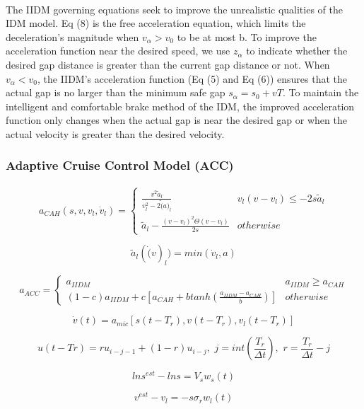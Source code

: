 \documentclass[12pt]{article}
\begin{document}
\paragraph{}
The IIDM governing equations seek to improve the unrealistic qualities of the IDM model. Eq (8) is the free acceleration equation, which limits the deceleration's magnitude when $v_\alpha>v_0$ to be at most b. To improve the acceleration function near the desired speed, we use $z_\alpha$ to indicate whether the desired gap distance is greater than the current gap distance or not.  When $v_\alpha < v_0$, the IIDM's acceleration function (Eq (5) and Eq (6)) ensures that the actual gap is no larger than the minimum safe gap $s_\alpha = s_0+vT$.  To maintain the intelligent and comfortable brake method of the IDM, the improved acceleration function only changes when the actual gap is near the desired gap or when the actual velocity is greater than the desired velocity.
\subsubsection{Adaptive Cruise Control Model (ACC)}



\paragraph{}
$$a_{CAH}(s,v,v_l, \dot{v}_l)= \begin{cases}
\frac{v^2\tilde{a}_l}{v_l^2 - 2 \tilde(a)_l} & v_l(v-v_l) \le -2s\tilde{a}_l\\
\tilde{a}_l - \frac{(v-v_l)^2 \Theta (v-v_l)}{2s} & otherwise
\end{cases}$$

$$\tilde{a}_l(\dot(v)_l) = min(\dot{v}_l, a)$$

$$a_{ACC}= \begin{cases}
a_{IIDM} & a_{IIDM} \ge a_{CAH}\\
(1-c)a_{IIDM} + c\left[a_{CAH} + b tanh(\frac{a_{IIDM}-a_{CAH}}{b}) \right] & otherwise
\end{cases}$$

$$\dot{v}(t) = a_{mic}\left[s(t-T_r), v(t-T_r), v_l(t-T_r) \right]$$

$$u(t-Tr) = ru_{i-j-1} + (1-r)u_{i-j},  \, \, j = int\left(\frac{T_r}{\Delta t} \right), \, \, r = \frac{T_r}{\Delta t} - j$$

$$ln s^{est} - ln s = V_s w_s(t) $$

$$v^{est} - v_l = -s \sigma_r w_l(t)$$
\end{document}

